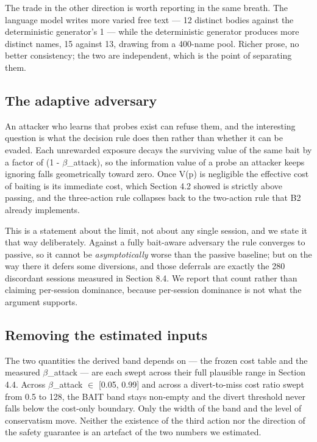 The trade in the other direction is worth reporting in the same breath. The
language model writes more varied free text --- 12 distinct bodies against the
deterministic generator's 1 --- while the deterministic generator produces more
distinct names, 15 against 13, drawing from a 400-name pool. Richer prose, no better
consistency; the two are independent, which is the point of separating them.


\subsection{The adaptive adversary}

An attacker who learns that probes exist can refuse them, and the interesting
question is what the decision rule does then rather than whether it can be evaded.
Each unrewarded exposure decays the surviving value of the same bait by a factor of
(1 - $\beta$\_attack), so the information value of a probe an attacker keeps ignoring
falls geometrically toward zero. Once
V(p) is negligible the effective cost of baiting is its immediate cost, which
Section 4.2 showed is strictly above passing, and the three-action rule collapses
back to the two-action rule that B2 already implements.

This is a statement about the limit, not about any single session, and we state it
that way deliberately. Against a fully bait-aware adversary the rule converges to
passive, so it cannot be \emph{asymptotically} worse than the passive baseline; but on
the way there it defers some diversions, and those deferrals are exactly the 280
discordant sessions measured in Section 8.4. We report that count rather than
claiming per-session dominance, because per-session dominance is not what the
argument supports.


\subsection{Removing the estimated inputs}

The two quantities the derived band depends on --- the frozen cost table and the
measured $\beta$\_attack --- are each swept across their full plausible range in
Section 4.4. Across $\beta$\_attack $\in$ [0.05, 0.99] and across a divert-to-miss cost ratio
swept from 0.5 to 128, the BAIT band stays non-empty and the divert threshold never
falls below the cost-only boundary. Only the width of the band and the level of
conservatism move. Neither the existence of the third action nor the direction of
the safety guarantee is an artefact of the two numbers we estimated.



